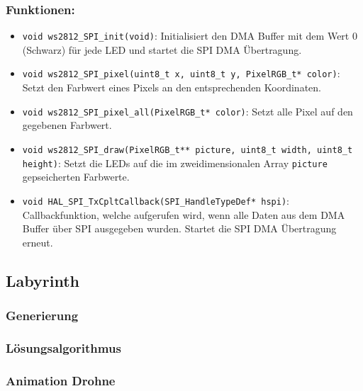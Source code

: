 \subsubsection*{Funktionen:}
{\renewcommand\labelitemi{}
\begin{itemize}[leftmargin=*]
    \item \texttt{void ws2812\_SPI\_init(void)}: Initialisiert den DMA Buffer mit dem Wert 0 (Schwarz) für jede LED und startet die SPI DMA Übertragung.
    \item \texttt{void ws2812\_SPI\_pixel(uint8\_t x, uint8\_t y, PixelRGB\_t* color)}: Setzt den Farbwert eines Pixels an den entsprechenden Koordinaten.
    \item \texttt{void ws2812\_SPI\_pixel\_all(PixelRGB\_t* color)}: Setzt alle Pixel auf den gegebenen Farbwert.
    \item \texttt{void ws2812\_SPI\_draw(PixelRGB\_t** picture, uint8\_t width, uint8\_t height)}: Setzt die LEDs auf die im zweidimensionalen Array \texttt{picture} gepseicherten Farbwerte.
    \item \texttt{void HAL\_SPI\_TxCpltCallback(SPI\_HandleTypeDef* hspi)}: Callbackfunktion, welche aufgerufen wird, wenn alle Daten aus dem DMA Buffer über SPI ausgegeben wurden. Startet die SPI DMA Übertragung erneut.
\end{itemize}
}

\subsection{Labyrinth} \label{Labyrinth}
\subsubsection{Generierung}
\subsubsection{Lösungsalgorithmus}
\subsubsection{Animation Drohne}